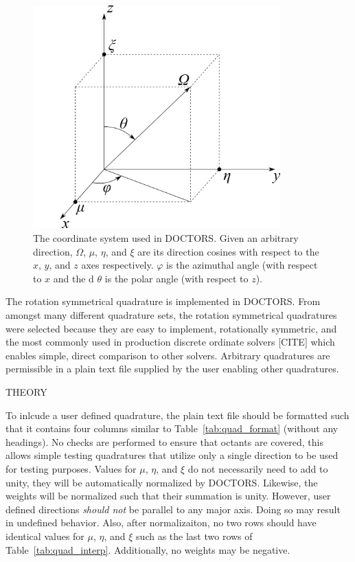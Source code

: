 \begin{figure}[tb]
  \begin{center}
   \includegraphics[width=3.75in]{figs/coord_sys}
  \end{center}
  \caption{The coordinate system used in DOCTORS. Given an arbitrary direction, $\Omega$, $\mu$, $\eta$, and $\xi$ are its direction cosines with respect to the $x$, $y$, and $z$ axes respectively. $\varphi$ is the azimuthal angle (with respect to $x$ and the d $\theta$ is the polar angle (with respect to $z$).}
\label{fig:coord_sys}
\end{figure}

The rotation symmetrical quadrature is implemented in DOCTORS. From amongst many different quadrature sets, the rotation symmetrical quadratures were selected because they are easy to implement, rotationally symmetric, and the most commonly used in production discrete ordinate solvers [CITE] which enables simple, direct comparison to other solvers. Arbitrary quadratures are permissible in a plain text file supplied by the user enabling other quadratures.

THEORY

To inlcude a user defined quadrature, the plain text file should be formatted such that it contains four columns similar to Table~\ref{tab:quad_format} (without any headings). No checks are performed to ensure that octants are covered, this allows simple testing quadratures that utilize only a single direction to be used for testing purposes. Values for $\mu$, $\eta$, and $\xi$ do not necessarily need to add to unity, they will be automatically normalized by DOCTORS. Likewise, the weights will be normalized such that their summation is unity. However, user defined directions \textit{should not} be parallel to any major axis. Doing so may result in undefined behavior. Also, after normalizaiton, no two rows should have identical values for $\mu$, $\eta$, and $\xi$ such as the last two rows of Table~\ref{tab:quad_interp}. Additionally, no weights may be negative.

